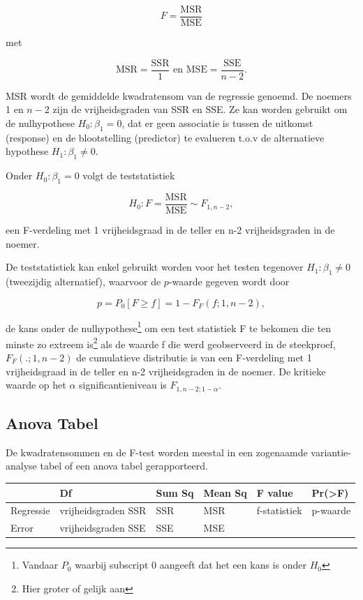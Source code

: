 \documentclass[
  12pt,dutch]{book}
\theoremstyle{definition}
\theoremstyle{definition}
\theoremstyle{definition}
\theoremstyle{definition}
\theoremstyle{remark}
\begin{document}
\[  F  = \frac{\text{MSR}}{\text{MSE}}\]

met

\[\text{MSR} = \frac{\text{SSR}}{1} \text{ en } \text{MSE} = \frac{\text{SSE}}{n-2}.\]

MSR wordt de gemiddelde kwadratensom van de regressie genoemd. De noemers 1 en \(n-2\) zijn de vrijheidsgraden van SSR en SSE.
Ze kan worden gebruikt om de nulhypothese \(H_0: \beta_1=0\), dat er geen associatie is tussen de uitkomst (response) en de blootstelling (predictor) te evalueren t.o.v de alternatieve hypothese \(H_1: \beta_1\neq0\).

Onder \(H_0: \beta_1=0\) volgt de teststatistiek

\[H_0:F = \frac{\text{MSR}}{\text{MSE}} \sim F_{1,n-2},\]

een F-verdeling met 1 vrijheidsgraad in de teller en n-2 vrijheidsgraden in de noemer.

De teststatistiek kan enkel gebruikt worden voor het testen tegenover \(H_1:\beta_1\neq 0\) (tweezijdig alternatief), waarvoor de \(p\)-waarde gegeven wordt door

\[  p = P_0\left[F\geq f\right]=1-F_F(f;1,n-2),\]

de kans onder de nulhypothese\footnote{Vandaar \(P_0\) waarbij subscript 0 aangeeft dat het een kans is onder \(H_0\)} om een test statistiek F te bekomen die ten minste zo extreem is\footnote{Hier groter of gelijk aan} als de waarde f die werd geobserveerd in de steekproef, \(F_F(.;1,n-2)\) de cumulatieve distributie is van een F-verdeling met 1 vrijheidsgraad in de teller en n-2 vrijheidsgraden in de noemer. De kritieke waarde op het \(\alpha\) significantieniveau is \(F_{1,n-2;1-\alpha}\).

\subsection{Anova Tabel}\label{anova-tabel}

De kwadratensommen en de F-test worden meestal in een zogenaamde variantie-analyse tabel of een anova tabel gerapporteerd.

\begin{tabular}{l|l|l|l|l|l}
\hline
  & Df & Sum Sq & Mean Sq & F value & Pr(>F)\\
\hline
Regressie & vrijheidsgraden SSR & SSR & MSR & f-statistiek & p-waarde\\
\hline
Error & vrijheidsgraden SSE & SSE & MSE &  & \\
\hline
\end{tabular}
\end{document}
